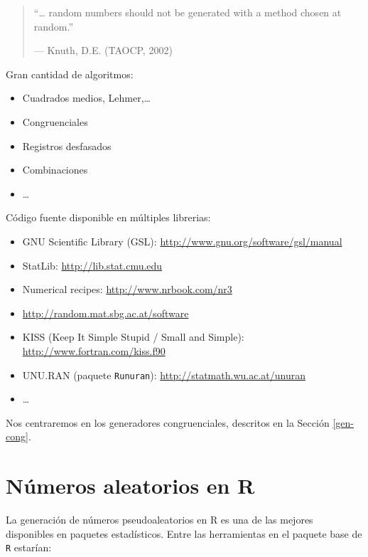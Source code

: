 \documentclass[
]{book}
\theoremstyle{break}
\theoremstyle{definition}
\theoremstyle{definition}
\theoremstyle{definition}
\theoremstyle{remark}
\begin{document}
\begin{quote}
``\ldots{} random numbers should not be generated with a method chosen at random.''

--- Knuth, D.E. (TAOCP, 2002)
\end{quote}

Gran cantidad de algoritmos:

\begin{itemize}
\item
  Cuadrados medios, Lehmer,\ldots{}
\item
  Congruenciales
\item
  Registros desfasados
\item
  Combinaciones
\item
  \ldots{}
\end{itemize}

Código fuente disponible en múltiples librerias:

\begin{itemize}
\item
  GNU Scientific Library (GSL):
  \href{http://www.gnu.org/software/gsl/manual/html_node/Random-Number-Generation.html}{http://www.gnu.org/software/gsl/manual}
\item
  StatLib: \url{http://lib.stat.cmu.edu}
\item
  Numerical recipes: \url{http://www.nrbook.com/nr3}
\item
  \url{http://random.mat.sbg.ac.at/software}
\item
  KISS (Keep It Simple Stupid / Small and Simple):
  \url{http://www.fortran.com/kiss.f90}
\item
  UNU.RAN (paquete \texttt{Runuran}):
  \url{http://statmath.wu.ac.at/unuran}
\item
  \ldots{}
\end{itemize}

Nos centraremos en los generadores congruenciales, descritos en la Sección \ref{gen-cong}.

\hypertarget{cap2}{%
\chapter{Números aleatorios en R}\label{cap2}}

La generación de números pseudoaleatorios en R es una de las mejores
disponibles en paquetes estadísticos.
Entre las herramientas en el paquete base de \texttt{R} estarían:
\end{document}
